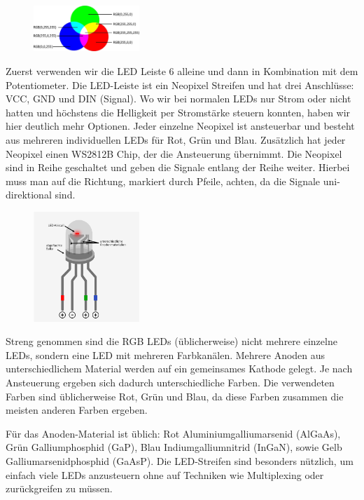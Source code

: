 \documentclass[a4paper,12pt]{book}
\begin{document}
\begin{figure}
  \includegraphics[width=4cm]{images/RGB_Farben.png}
\end{figure}
Zuerst verwenden wir die LED Leiste 6 alleine und dann in Kombination mit dem Potentiometer.
Die LED-Leiste ist ein Neopixel Streifen und hat drei Anschlüsse: VCC, GND und DIN (Signal).
Wo wir bei normalen LEDs nur Strom oder nicht hatten und höchstens die Helligkeit per Stromstärke steuern konnten,
haben wir hier deutlich mehr Optionen.
Jeder einzelne Neopixel ist ansteuerbar und besteht aus mehreren individuellen LEDs für Rot, Grün und Blau.
Zusätzlich hat jeder Neopixel einen WS2812B Chip, der die Ansteuerung übernimmt. 
Die Neopixel sind in Reihe geschaltet und geben die Signale entlang der Reihe weiter. 
Hierbei muss man auf die Richtung, markiert durch Pfeile, achten, da die Signale uni-direktional sind.

\begin{figure}
  \includegraphics[width=4cm]{images/RGB-LED.jpg}
\end{figure}
Streng genommen sind die RGB LEDs (üblicherweise) nicht mehrere einzelne LEDs, sondern eine LED mit mehreren Farbkanälen.
Mehrere Anoden aus unterschiedlichem Material werden auf ein gemeinsames Kathode gelegt.
Je nach Ansteuerung ergeben sich dadurch unterschiedliche Farben. 
Die verwendeten Farben sind üblicherweise Rot, Grün und Blau, da diese Farben zusammen die meisten anderen Farben ergeben.

Für das Anoden-Material ist üblich: Rot Aluminiumgalliumarsenid (AlGaAs), Grün Galliumphosphid (GaP), Blau Indiumgalliumnitrid (InGaN),
sowie Gelb Galliumarsenidphosphid (GaAsP).
Die LED-Streifen sind besonders nützlich, um einfach viele LEDs anzusteuern ohne auf Techniken wie Multiplexing oder  zurückgreifen zu müssen.
\end{document}
